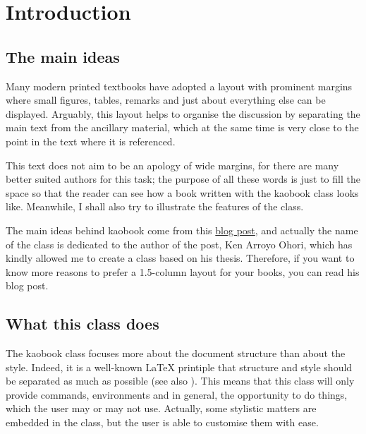\setchapterpreamble[u]{\margintoc}
\chapter{Introduction}

\section{The main ideas}

Many modern printed textbooks have adopted a layout with prominent 
margins where small figures, tables, remarks and just about everything 
else can be displayed. Arguably, this layout helps to organise the 
discussion by separating the main text from the ancillary material, 
which at the same time is very close to the point in the text where it 
is referenced.

This text does not aim to be an apology of wide margins, for there are 
many better suited authors for this task; the purpose of all these words 
is just to fill the space so that the reader can see how a book written 
with the kaobook class looks like. Meanwhile, I shall also try to 
illustrate the features of the class.

The main ideas behind kaobook come from this 
\href{https://3d.bk.tudelft.nl/ken/en/2016/04/17/a-1.5-column-layout-in-latex.html}{blog 
	post}, and actually the name of the class is dedicated to the author 
of the post, Ken Arroyo Ohori, which has kindly allowed me to create a 
class based on his thesis. Therefore, if you want to know more reasons 
to prefer a 1.5-column layout for your books, you can read his blog 
post.

\section{What this class does}

The kaobook class focuses more about the document structure than about 
the style. Indeed, it is a well-known \LaTeX\xspace printiple that 
structure and style should be separated as much as possible (see also 
). This means that this class will only provide 
commands, environments and in general, the opportunity to do things, 
which the user may or may not use. Actually, some stylistic matters are 
embedded in the class, but the user is able to customise them with ease.

